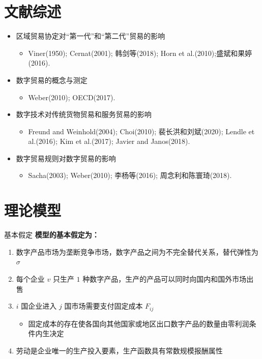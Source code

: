 \documentclass{beamer}
\begin{document}
\section{文献综述}
\begin{frame}
    \begin{itemize}
        \item 区域贸易协定对“第一代”和“第二代”贸易的影响
        \begin{itemize}
            \item Viner(1950); Cernat(2001); 韩剑等(2018); Horn et al.(2010);盛斌和果婷(2016).
        \end{itemize}
        \item 数字贸易的概念与测定
        \begin{itemize}
            \item Weber(2010); OECD(2017).
        \end{itemize}
        \item 数字技术对传统货物贸易和服务贸易的影响
        \begin{itemize}
            \item Freund and Weinhold(2004); Choi(2010); 裴长洪和刘斌(2020); Lendle et al.(2016); Kim et al.(2017); Javier and Janos(2018).
        \end{itemize}
        \item 数字贸易规则对数字贸易的影响
        \begin{itemize}
            \item Sacha(2003); Weber(2010); 李杨等(2016); 周念利和陈寰琦(2018).
        \end{itemize}
    \end{itemize}
\end{frame}


\section{理论模型}
\begin{frame}{基本假定}
    \textbf{模型的基本假定为：}
    \begin{enumerate}
        \item 数字产品市场为垄断竞争市场，数字产品之间为不完全替代关系，替代弹性为 $\sigma$ 
        \item 每个企业 $v$ 只生产 $1$ 种数字产品，生产的产品可以同时向国内和国外市场出售
        \item $i$ 国企业进入 $j$ 国市场需要支付固定成本 $F_{ij}$ 
        \begin{itemize}
            \item 固定成本的存在使各国向其他国家或地区出口数字产品的数量由零利润条件内生决定
        \end{itemize}
        \item 劳动是企业唯一的生产投入要素，生产函数具有常数规模报酬属性
    \end{enumerate}
\end{frame}
\end{document}
